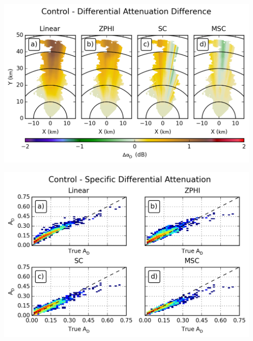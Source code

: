 \documentclass[red]{beamer}
\begin{document}
\begin{frame}
    \begin{center}
        \includegraphics[scale=0.7]{figures/spatial/C_Control_Differential_Attenuation_Difference}
    \end{center}
\end{frame}

\begin{frame}
    \begin{center}
        \includegraphics[scale=0.7]{figures/spatial/C_Control_Specific_Differential_Attenuation_scatter}
    \end{center}
\end{frame}
\end{document}
